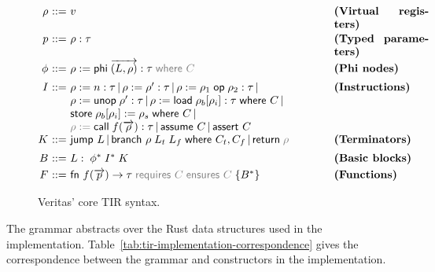 \begin{figure}[H]
{\small
\[
\renewcommand{\arraystretch}{1.09}
\begin{array}{@{}r@{\ }c@{\ }l@{\hspace{1.2em}}p{0.25\textwidth}@{}}
  \rho & ::= &
  v
  & \textbf{(Virtual registers)} \\[2pt]
  p & ::= &
  \rho : \tau
  & \textbf{(Typed parameters)} \\[2pt]
  \phi & ::= &
  \rho := \textsf{phi}\; \overrightarrow{(L,\rho)} : \tau\; \optclause{\textsf{where } C}
  & \textbf{(Phi nodes)} \\[4pt]
  I & ::= &
  \parbox[t]{0.66\textwidth}{
    $\rho := n : \tau \,|\, \rho := \rho' : \tau \,|\, \rho := \rho_1\; \textsf{op}\; \rho_2 : \tau \,|\, {}$\\
    $\rho := \textsf{unop}\; \rho' : \tau \,|\, \rho := \textsf{load}\; \rho_b[\rho_i] : \tau\; \textsf{where } C \,|\, {}$\\
    $\textsf{store}\; \rho_b[\rho_i] := \rho_s\; \textsf{where } C \,|\, {}$\\
    $\optclause{\rho :=}\; \textsf{call}\; f(\overrightarrow{\rho}) : \tau \,|\, \textsf{assume } C \,|\, \textsf{assert } C$
  }
  & \textbf{(Instructions)} \\[4pt]
  K & ::= &
  \parbox[t]{0.66\textwidth}{
    $\textsf{jump } L \,|\, \textsf{branch } \rho\; L_t\; L_f\; \textsf{where } C_t, C_f \,|\, \textsf{return}\; \optclause{\rho}$
  }
  & \textbf{(Terminators)} \\[4pt]
  B & ::= &
  L:\; \phi^*\; I^*\; K
  & \textbf{(Basic blocks)} \\[2pt]
  F & ::= &
  \textsf{fn } f(\overrightarrow{p}) \rightarrow \tau\; \optclause{\textsf{requires } C}\; \optclause{\textsf{ensures } C}\; \{B^*\}
  & \textbf{(Functions)}
\end{array}
\]
}
\caption{Veritas' core TIR syntax.}
\label{fig:tir-syntax}
\end{figure}

The grammar abstracts over the Rust data structures used in the implementation. Table~\ref{tab:tir-implementation-correspondence} gives the correspondence between the grammar and constructors in the implementation.


